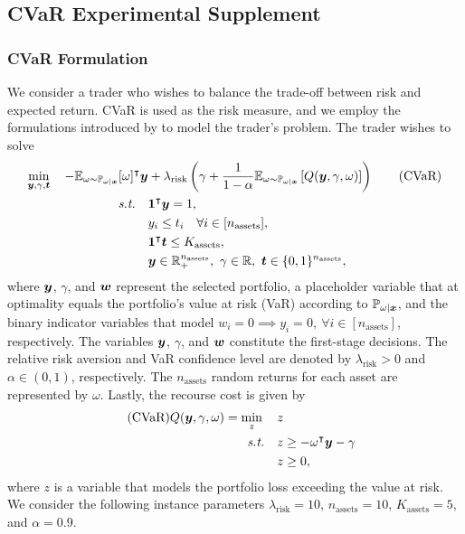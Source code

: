 \newpage 
\subsection{CVaR Experimental Supplement}
\subsubsection{CVaR Formulation} \label{appendix:cvar_formulation}
We consider a trader who wishes to balance the trade-off between risk and expected return. CVaR is used as the risk measure, and we employ the formulations introduced by \citet{krokhmal2002portfolio} to model the trader's problem. The trader wishes to solve
 \begin{align}\label{eq:CVaR}
 \min_{\boldsymbol{y}, \gamma, \boldsymbol{t}}\quad   - \mathbb{E}_{\omega \sim \mathbb{P}_{\omega|\boldsymbol{x}}}[\omega]^{\intercal} \boldsymbol{y}  
        &+  \lambda_{\text{risk}} \left( \gamma + \frac{1}{1-\alpha} \mathbb{E}_{\omega \sim \mathbb{P}_{\omega|\boldsymbol{x}}} \left[ Q(\boldsymbol{y} , \gamma,  \omega)\right] \right) \tag{CVaR} \\
 \textit{s.t.} \quad  &\boldsymbol{1}^{\intercal} \boldsymbol{y} = 1, \notag \\
        &y_i \leq t_i \quad \forall i \in [n_{\text{assets}}],  \notag \\
        &\boldsymbol{1}^{\intercal} \boldsymbol{t} \leq K_{\text{assets}}, \notag  \\
        &\boldsymbol{y} \in \mathbb{R}_+^{n_{\text{assets}}},\ \gamma \in \mathbb{R}, \ \boldsymbol{t} \in \{0,1\}^{n_{\text{assets}}}, \notag
 \end{align} 
 where $\boldsymbol{y}$, $\gamma$, and $\boldsymbol{w}$ represent the selected portfolio, a placeholder variable that at optimality equals the portfolio's value at risk (VaR) according to $\mathbb{P}_{\omega | \boldsymbol{x}}$, and the binary indicator variables that model $w_i = 0 \implies y_i = 0, \ \forall i \in [n_{\text{assets}}]$, respectively. The variables $\boldsymbol{y}$, $\gamma$, and $\boldsymbol{w}$ constitute the first-stage decisions. The relative risk aversion and VaR confidence level are denoted by $\lambda_{\text{risk}} > 0$ and $\alpha \in (0,1)$, respectively. The $n_{\text{assets}}$ random returns for each asset are represented by $\omega$. Lastly, the recourse cost is given by
 \begin{align}\label{eq:CVaRstage2} \tag{CVaR}
 Q(\boldsymbol{y}, \gamma,  \omega) = \min_{z} \quad  z \notag  \\ \textit{s.t.}  \quad  z & \geq -\omega^{\intercal} \boldsymbol{y} - \gamma  \notag \\
 \quad  z & \geq 0, \notag
 \end{align}
where $z$ is a variable that models the portfolio loss exceeding the value at risk. We consider the following instance parameters $\lambda_{\text{risk}} = 10$, $n_{\text{assets}} = 10$, $K_{\text{assets}} = 5$, and $\alpha = 0.9$.


